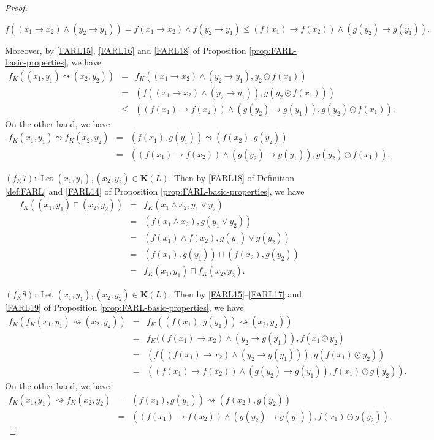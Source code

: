 \documentclass[final,12pt,times]{elsarticle}
\theoremstyle{plain}
\theoremstyle{definition}
\theoremstyle{break}
\begin{document}
\begin{proof}
\begin{center} $f((x_1\rightarrow x_2)\wedge(y_2\rightarrow y_1))=f(x_1\rightarrow x_2)\wedge f (y_2\rightarrow y_1)\leq (f(x_1)\rightarrow f(x_2))\wedge (g(y_2)\rightarrow g(y_1)).$
\end{center}
Moreover, by \ref{FARL15}, \ref{FARL16} and \ref{FARL18} of Proposition \ref{prop:FARL-basic-properties}, we have
\begin{eqnarray*}
               f_K((x_1,y_1)\leadsto(x_2,y_2)) &=& f_K((x_1\rightarrow x_2)\wedge(y_2\rightarrow y_1), y_2\odot f(x_1))\\ &=& (f((x_1\rightarrow x_2)\wedge(y_2\rightarrow y_1)),g (y_2\odot f(x_1)))\\ &\leq & ((f(x_1)\rightarrow f(x_2))\wedge (g(y_2)\rightarrow g(y_1)), g(y_2)\odot f(x_1)).
               \end{eqnarray*}
On the other hand, we have
\begin{eqnarray*}
               f_K(x_1,y_1)\leadsto f_K(x_2,y_2)&=& (f(x_1),g(y_1))\leadsto (f(x_2),g(y_2))\\ &=& ((f(x_1)\rightarrow f (x_2))\wedge (g(y_2)\rightarrow g(y_1)), g (y_2)\odot f(x_1)).
               \end{eqnarray*}
                              
$(f_K7)$:\ Let $(x_1,y_1),(x_2,y_2)\in \mathbf{K}(L)$. Then by \ref{FARL18} of Definition \ref{def:FARL} and \eqref{FARL14} of Proposition \ref{prop:FARL-basic-properties}, we have
\begin{eqnarray*}
               f_K((x_1,y_1)\sqcap(x_2,y_2))&=& f_K(x_1\wedge x_2,y_1\vee y_2)\\ &=& (f(x_1\wedge x_2),g(y_1\vee y_2))\\ &=& (f (x_1)\wedge f(x_2),g(y_1)\vee g(y_2))\\ &=& (f(x_1),g(y_1))\sqcap (f(x_2), g(y_2))\\ &=& f_K(x_1,y_1)\sqcap f_K(x_2,y_2).
               \end{eqnarray*}

$(f_K8)$:\ Let $(x_1,y_1),(x_2,y_2)\in \mathbf{K}(L)$. Then by \ref{FARL15}--\eqref{FARL17} and \ref{FARL19} of Proposition \ref{prop:FARL-basic-properties}, we have
\begin{eqnarray*}
               f_K(f_K(x_1,y_1)\rightsquigarrow(x_2,y_2))&=& f_K((f(x_1),g(y_1))\rightsquigarrow(x_2,y_2))\\ &=& f_K((f (x_1)\rightarrow x_2)\wedge(y_2\rightarrow g(y_1)),f(x_1\odot y_2)\\ &=& (f((f (x_1)\rightarrow x_2)\wedge(y_2\rightarrow g(y_1))),g(f(x_1)\odot y_2))\\ &=& ((f(x_1)\rightarrow f(x_2))\wedge (g(y_2)\rightarrow g(y_1)),f(x_1)\odot g(y_2)).
               \end{eqnarray*}
On the other hand, we have
\begin{eqnarray*}
               f_K(x_1,y_1)\rightsquigarrow f_K(x_2,y_2)&=& (f(x_1),g(y_1))\rightsquigarrow (f(x_2),g(y_2))\\ &=& ((f (x_1)\rightarrow f(x_2))\wedge (g(y_2)\rightarrow g(y_1)),f(x_1)\odot g(y_2)).
               \end{eqnarray*}
               

\end{proof}
\end{document}
